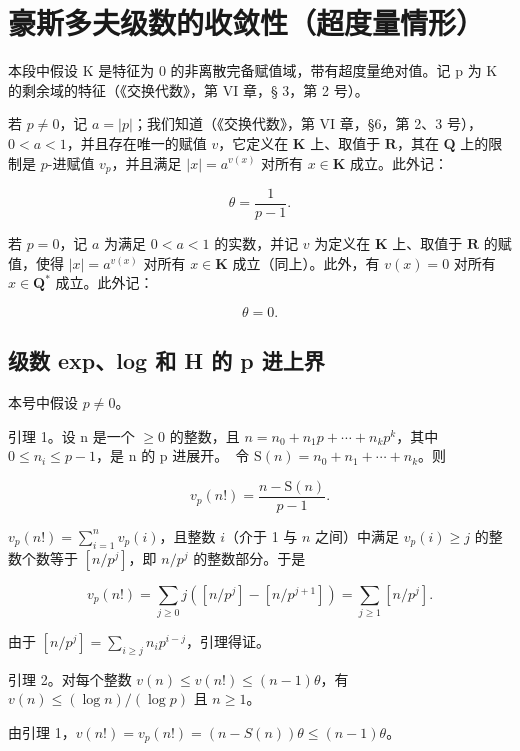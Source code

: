 \section{豪斯多夫级数的收敛性（超度量情形）}

本段中假设 K 是特征为 0 的非离散完备赋值域，带有超度量绝对值。记 p 为 K 的剩余域的特征（《交换代数》，第 VI 章，§ 3，第 2 号）。

若 \(p \neq 0\)，记 \(a = |p|\)；我们知道（《交换代数》，第 VI 章，§6，第 2、3 号），\(0 < a < 1\)，并且存在唯一的赋值 \(v\)，它定义在 \(\mathbf{K}\) 上、取值于 \(\mathbf{R}\)，其在 \(\mathbf{Q}\) 上的限制是 \(p\)-进赋值 \(v_p\)，并且满足 \(|x| = a^{v(x)}\) 对所有 \(x \in \mathbf{K}\) 成立。此外记：

\[
\theta = \frac {1}{p - 1}.\tag{1}
\]

若 \(p = 0\)，记 \(a\) 为满足 \(0 < a < 1\) 的实数，并记 \(v\) 为定义在 \(\mathbf{K}\) 上、取值于 \(\mathbf{R}\) 的赋值，使得 \(|x| = a^{v(x)}\) 对所有 \(x \in \mathbf{K}\) 成立（同上）。此外，有 \(v(x) = 0\) 对所有 \(x \in \mathbf{Q}^*\) 成立。此外记：

\[
\theta = 0.\tag{2}
\]

\subsection{级数 exp、log 和 H 的 p 进上界}

本号中假设 \(p \neq 0\)。

引理 1。设 n 是一个 \(\geqslant0\) 的整数，且 \(n=n_{0}+n_{1}p+\cdots+n_{k}p^{k}\)，其中 \(0\leqslant n_{i}\leqslant p-1\)，是 n 的 p 进展开。~令 \(\mathrm{S}(n)=n_{0}+n_{1}+\cdots+n_{k}\)。则

\[
v _ {p} (n!) = \frac {n - \mathrm{S} (n)}{p - 1}.\tag{3}
\]

  \(v_{p}(n!) = \sum_{i=1}^{n} v_{p}(i)\)，且整数 \(i\)（介于 1 与 \(n\) 之间）中满足 \(v_{p}(i) \geqslant j\) 的整数个数等于 \([n/p^{j}]\)，即 \(n/p^{j}\) 的整数部分。于是

\[
v _ {p} (n!) = \sum_ {j \geqslant 0} j ([ n / p ^ {j} ] - [ n / p ^ {j + 1} ]) = \sum_ {j \geqslant 1} [ n / p ^ {j} ].
\]

由于 \([n / p^j] = \sum_{i\geqslant j}n_i p^{i - j}\)，引理得证。

引理 2。对每个整数 \(v(n) \leqslant v(n!) \leqslant (n - 1)\theta\)，有 \(v(n) \leqslant (\log n) / (\log p)\) 且 \(n \geqslant 1\)。

由引理 1，\(v(n!) = v_{p}(n!) = (n - S(n))\theta \leqslant (n - 1)\theta\)。


